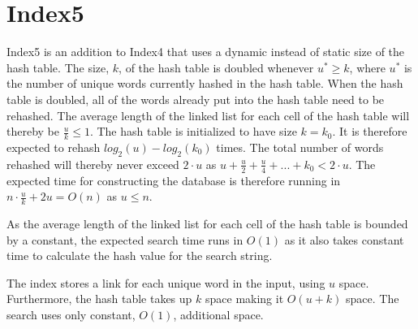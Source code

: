 \section{Index5}
\label{section:Index5}

Index5 is an addition to Index4 that uses a dynamic instead of static size of the hash table. The size, $k$, of the hash table is doubled whenever $u^*\geq k$, where $u^*$ is the number of unique words currently hashed in the hash table. When the hash table is doubled, all of the words already put into the hash table need to be rehashed. The average length of the linked list for each cell of the hash table will thereby be $\frac{u}{k} \leq 1$. The hash table is initialized to have size $k=k_0$. It is therefore expected to rehash $log_2(u)-log_2(k_0)$ times. The total number of words rehashed will thereby never exceed $2\cdot u$ as $u + \frac{u}{2} + \frac{u}{4} + ... + k_0 < 2\cdot u$. The expected time for constructing the database is therefore running in $n\cdot \frac{u}{k} + 2u = O(n)$ as $u\leq n$.

As the average length of the linked list for each cell of the hash table is bounded by a constant, the expected search time runs in $O(1)$ as it also takes constant time to calculate the hash value for the search string.

The index stores a link for each unique word in the input, using $u$ space. Furthermore, the hash table takes up $k$ space making it $O(u+k)$ space. The search uses only constant, $O(1)$, additional space. 
